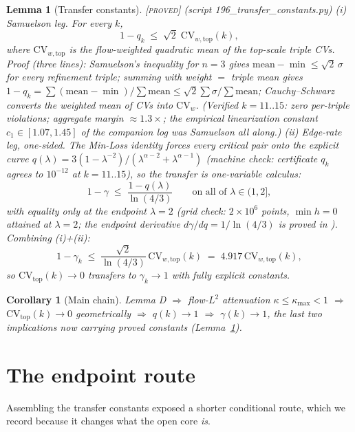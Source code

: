 \documentclass[11pt]{article}
\newtheorem{lemma}[theorem]{Lemma}
\newtheorem{corollary}[theorem]{Corollary}
\theoremstyle{definition}
\newcommand{\PROVED}{\textup{[\textsc{proved}]}}
\newcommand{\lam}{\lambda}
\begin{document}
\begin{lemma}[Transfer constants]\label{lem:transfer} \PROVED{}
(script 196\_transfer\_constants.py)
\emph{(i) Samuelson leg.} For every $k$,
\[
1 - q_k \;\le\; \sqrt2\;\mathrm{CV}_{w,\mathrm{top}}(k),
\]
where $\mathrm{CV}_{w,\mathrm{top}}$ is the flow-weighted quadratic mean
of the top-scale triple CVs. \emph{Proof (three lines):} Samuelson's
inequality for $n=3$ gives $\mathrm{mean} - \min \le \sqrt2\,\sigma$ for
every refinement triple; summing with weight $=$ triple mean gives
$1 - q_k = \sum(\mathrm{mean}-\min)/\sum\mathrm{mean} \le
\sqrt2 \sum\sigma/\sum\mathrm{mean}$; Cauchy--Schwarz converts the
weighted mean of CVs into $\mathrm{CV}_w$. (Verified $k=11..15$: zero
per-triple violations; aggregate margin $\approx 1.3\times$; the
empirical linearization constant $c_1 \in [1.07, 1.45]$ of the companion
log was Samuelson all along.)
\emph{(ii) Edge-rate leg, one-sided.} The Min-Loss identity forces every
critical pair onto the \emph{explicit} curve
$q(\lam) = 3(1-\lam^{-2})/(\lam^{\alpha-2}+\lam^{\alpha-1})$ (machine
check: certificate $q_k$ agrees to $10^{-12}$ at $k = 11..15$), so the
transfer is one-variable calculus:
\[
1 - \gamma \;\le\; \frac{1-q(\lam)}{\ln(4/3)}
\qquad\text{on all of } \lam \in (1,2],
\]
with equality only at the endpoint $\lam = 2$ (grid check: $2\times 10^6$
points, $\min h = 0$ attained at $\lam = 2$; the endpoint derivative
$d\gamma/dq = 1/\ln(4/3)$ is proved in \cite{G1}). Combining (i)+(ii):
\[
1 - \gamma_k \;\le\; \frac{\sqrt2}{\ln(4/3)}\,
\mathrm{CV}_{w,\mathrm{top}}(k) \;=\; 4.917\,\mathrm{CV}_{w,\mathrm{top}}(k),
\]
so $\mathrm{CV}_{\mathrm{top}}(k) \to 0$ transfers to $\gamma_k \to 1$
with fully explicit constants.
\end{lemma}

\begin{corollary}[Main chain]\label{cor:chain}
Lemma D $\Rightarrow$ flow-$L^2$ attenuation $\kappa \le \kappa_{\max} < 1$
$\Rightarrow$ $\mathrm{CV}_{\mathrm{top}}(k) \to 0$ geometrically
$\Rightarrow$ $q(k) \to 1$ $\Rightarrow$ $\gamma(k) \to 1$, the last two
implications now carrying proved constants (Lemma~\ref{lem:transfer}).
\end{corollary}

\section{The endpoint route}

Assembling the transfer constants exposed a shorter conditional route,
which we record because it changes what the open core \emph{is}.
\end{document}
